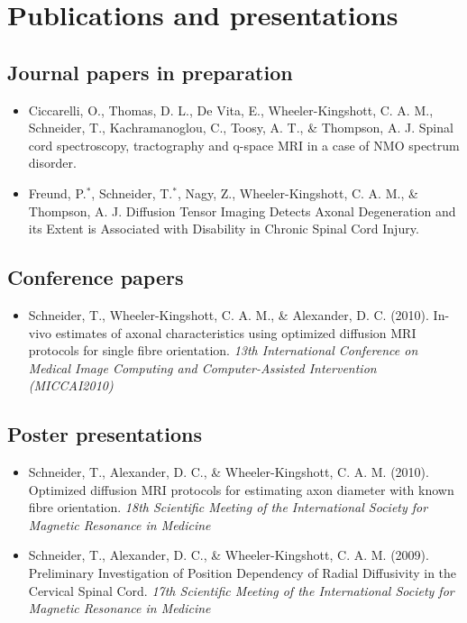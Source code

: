 \section{Publications and presentations}
\subsection*{Journal papers in preparation}
\begin{itemize}
  \item Ciccarelli, O., Thomas, D. L., De Vita, E., Wheeler-Kingshott, C. A. M., Schneider, T., Kachramanoglou, C., Toosy, A. T., \& Thompson, A. J. Spinal cord spectroscopy, tractography and q-space MRI in a case of NMO spectrum disorder.
  \item Freund, P.$^*$, Schneider, T.$^*$, Nagy, Z., Wheeler-Kingshott, C. A. M., \& Thompson, A. J. Diffusion Tensor Imaging Detects Axonal Degeneration and its Extent is Associated with Disability in Chronic Spinal Cord Injury.  
\end{itemize}
\subsection*{Conference papers}
\begin{itemize}
  \item Schneider, T., Wheeler-Kingshott, C. A. M., \& Alexander, D. C. (2010). In-vivo estimates of axonal characteristics using optimized diffusion MRI protocols for single fibre orientation. \emph{13th International Conference on Medical Image Computing and Computer-Assisted Intervention (MICCAI2010)}  
\end{itemize}
\subsection*{Poster presentations}
\begin{itemize}
  \item Schneider, T., Alexander, D. C., \& Wheeler-Kingshott, C. A. M. (2010). Optimized diffusion MRI protocols for estimating axon diameter with known fibre orientation. \emph{18th Scientific Meeting of the International Society for Magnetic Resonance in Medicine}
  \item Schneider, T., Alexander, D. C., \& Wheeler-Kingshott, C. A. M. (2009). Preliminary Investigation of Position Dependency of Radial Diffusivity in the Cervical Spinal Cord. \emph{17th Scientific Meeting of the International Society for Magnetic Resonance in Medicine}  
\end{itemize}

